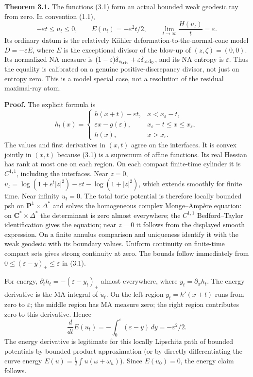 \documentclass[
  11pt,
]{article}
\begin{document}
\textbf{Theorem 3.1.} The functions (3.1) form an actual bounded weak
geodesic ray from zero. In convention (1.1), \[
 -\varepsilon t\leq u_t\leq0,\qquad E(u_t)=-\varepsilon^2t/2,\qquad
 \lim_{t\to\infty}\frac{H(u_t)}t=\varepsilon.                        \tag{3.2}
\] Its ordinary datum is the relatively Kähler
deformation-to-the-normal-cone model \(D=-\varepsilon E\), where \(E\)
is the exceptional divisor of the blow-up of \((z,\zeta)=(0,0)\). Its
normalized NA measure is
\((1-\varepsilon)\delta_{v_{\rm triv}}+\varepsilon\delta_{\operatorname{ord}_0}\),
and its NA entropy is \(\varepsilon\). Thus the equality is calibrated
on a genuine positive-discrepancy divisor, not just on entropy zero.
This is a model special case, not a resolution of the residual
maximal-ray atom.

\textbf{Proof.} The explicit formula is \[
 h_t(x)=
 \begin{cases}
 h(x+t)-\varepsilon t,&x<x_\varepsilon-t,\\
 \varepsilon x-g(\varepsilon),&x_\varepsilon-t\leq x\leq x_\varepsilon,\\
 h(x),&x>x_\varepsilon.
 \end{cases}                                                \tag{3.3}
\] The values and first derivatives in \((x,t)\) agree on the
interfaces. It is convex jointly in \((x,t)\) because (3.1) is a
supremum of affine functions. Its real Hessian has rank at most one on
each region. On each compact finite-time cylinder it is \(C^{1,1}\),
including the interfaces. Near \(z=0\),
\(u_t=\log(1+e^t|z|^2)-\varepsilon t-\log(1+|z|^2)\), which extends
smoothly for finite time. Near infinity \(u_t=0\). The total toric
potential is therefore locally bounded psh on
\(\mathbf P^1\times\Delta^*\) and solves the homogeneous complex
Monge--Ampère equation: on \(\mathbf C^*\times\Delta^*\) the determinant
is zero almost everywhere; the \(C^{1,1}\) Bedford--Taylor
identification gives the equation; near \(z=0\) it follows from the
displayed smooth expression. On a finite annulus comparison and
uniqueness identify it with the weak geodesic with its boundary values.
Uniform continuity on finite-time compact sets gives strong continuity
at zero. The bounds follow immediately from
\(0\leq(\varepsilon-y)_+\leq \varepsilon\) in (3.1).

For energy, \(\partial_t h_t=-(\varepsilon-y_t)_+\) almost everywhere,
where \(y_t=\partial_xh_t\). The energy derivative is the MA integral of
\(\dot u_t\). On the left region \(y_t=h'(x+t)\) runs from zero to
\(\varepsilon\); the middle region has MA measure zero; the right region
contributes zero to this derivative. Hence \[
 \frac{d}{dt}E(u_t)=-\int_0^\varepsilon(\varepsilon-y)\,dy=-\varepsilon^2/2.
\] The energy derivative is legitimate for this locally Lipschitz path
of bounded potentials by bounded product approximation (or by directly
differentiating the curve energy
\(E(u)=\frac12\int u(\omega+\omega_u)\)). Since \(E(u_0)=0\), the energy
claim follows.
\end{document}
